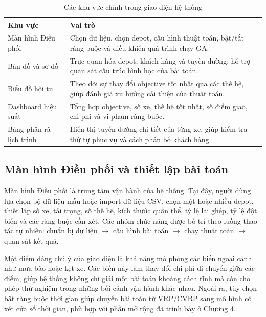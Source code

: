 \documentclass[12pt,a4paper]{article}
\numberwithin{figure}{subsection}
\numberwithin{table}{subsection}
\begin{document}
\begin{table}[htbp]
    \centering
    \caption{Các khu vực chính trong giao diện hệ thống}
    \label{tab:ui_main_regions}
    \renewcommand{\arraystretch}{1.28}
    \begin{tabular}{|p{4cm}|p{9.8cm}|}
        \hline
        \textbf{Khu vực} & \textbf{Vai trò} \\
        \hline
        Màn hình Điều phối & Chọn dữ liệu, chọn depot, cấu hình thuật toán, bật/tắt ràng buộc và điều khiển quá trình chạy GA. \\
        \hline
        Bản đồ và sơ đồ & Trực quan hóa depot, khách hàng và tuyến đường; hỗ trợ quan sát cấu trúc hình học của bài toán. \\
        \hline
        Biểu đồ hội tụ & Theo dõi sự thay đổi objective tốt nhất qua các thế hệ, giúp đánh giá xu hướng cải thiện của thuật toán. \\
        \hline
        Dashboard hiệu suất & Tổng hợp objective, số xe, thế hệ tốt nhất, số điểm giao, chi phí và vi phạm ràng buộc. \\
        \hline
        Bảng phân rã lịch trình & Hiển thị tuyến đường chi tiết của từng xe, giúp kiểm tra thứ tự phục vụ và cách phân bổ khách hàng. \\
        \hline
    \end{tabular}
\end{table}

\subsection{Màn hình Điều phối và thiết lập bài toán}

Màn hình Điều phối là trung tâm vận hành của hệ thống. Tại đây, người dùng lựa chọn bộ dữ liệu mẫu hoặc import dữ liệu CSV, chọn một hoặc nhiều depot, thiết lập số xe, tải trọng, số thế hệ, kích thước quần thể, tỷ lệ lai ghép, tỷ lệ đột biến và các ràng buộc cần xét. Các nhóm chức năng được bố trí theo luồng thao tác tự nhiên: chuẩn bị dữ liệu $\rightarrow$ cấu hình bài toán $\rightarrow$ chạy thuật toán $\rightarrow$ quan sát kết quả.

Một điểm đáng chú ý của giao diện là khả năng mô phỏng các biến ngoại cảnh như mưa bão hoặc kẹt xe. Các biến này làm thay đổi chi phí di chuyển giữa các điểm, giúp hệ thống không chỉ giải một bài toán khoảng cách tĩnh mà còn cho phép thử nghiệm trong những bối cảnh vận hành khác nhau. Ngoài ra, tùy chọn bật ràng buộc thời gian giúp chuyển bài toán từ VRP/CVRP sang mô hình có xét cửa sổ thời gian, phù hợp với phần mở rộng đã trình bày ở Chương 4.
\end{document}
